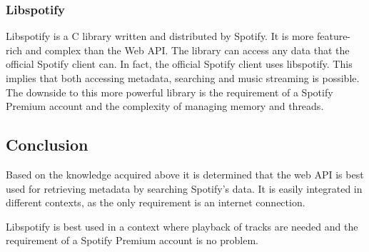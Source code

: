 \subsubsection{Libspotify}
\label{techPlat:music_catalog_libspotify}

Libspotify is a C library written and distributed by Spotify. It is more feature-rich and complex than the Web API. The library can access any data that the official Spotify client can. In fact, the official Spotify client uses libspotify. This implies that both accessing metadata, searching and music streaming is possible. The downside to this more powerful library is the requirement of a Spotify Premium account and the complexity of managing memory and threads.

\subsection{Conclusion}
\label{ssub:music_catalog_conclusion}

Based on the knowledge acquired above it is determined that the web API is best used for retrieving metadata by searching Spotify's data. It is easily integrated in different contexts, as the only requirement is an internet connection.

Libspotify is best used in a context where playback of tracks are needed and the requirement of a Spotify Premium account is no problem.
